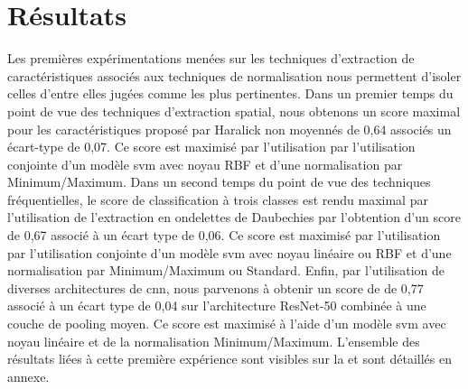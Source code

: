 \section{Résultats}
Les premières expérimentations menées sur les techniques d'extraction de caractéristiques associés aux techniques de normalisation nous permettent d'isoler celles d'entre elles jugées comme les plus pertinentes. Dans un premier temps du point de vue des techniques d'extraction spatial, nous obtenons un score maximal pour les caractéristiques proposé par Haralick non moyennés de 0,64 associés un écart-type de 0,07. Ce score est maximisé par l'utilisation par l'utilisation conjointe d'un modèle \gls{svm} avec noyau RBF et d'une normalisation par Minimum/Maximum. Dans un second temps du point de vue des techniques fréquentielles, le score de classification à trois classes est rendu maximal par l'utilisation de l'extraction en ondelettes de Daubechies par l'obtention d'un score de 0,67 associé à un écart type de 0,06. Ce score est maximisé par l'utilisation par l'utilisation conjointe d'un modèle \gls{svm} avec noyau linéaire ou RBF et d'une normalisation par Minimum/Maximum ou Standard. Enfin, par l'utilisation de diverses architectures de \gls{cnn}, nous parvenons à obtenir un score de de 0,77 associé à un écart type de 0,04 sur l'architecture ResNet-50 combinée à une couche de pooling moyen. Ce score est maximisé à l'aide d'un modèle \gls{svm} avec noyau linéaire et de la normalisation Minimum/Maximum. L'ensemble des résultats liées à cette première expérience sont visibles sur la  et sont détaillés en annexe.\par

